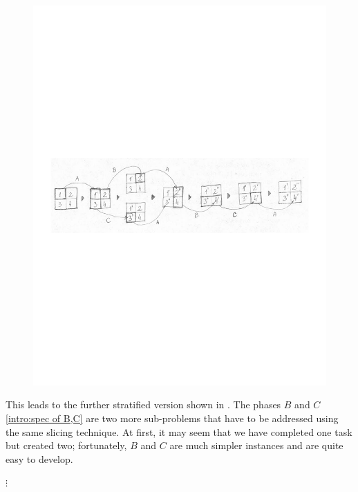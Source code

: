 \begin{figure}
\begin{center}
\includegraphics[width=.9\textwidth]{img/gap-stratify-A}
\end{center}
\caption{\label{intro:arbiter stratify A chain}}
\end{figure}

This leads to the further stratified version shown in .
The phases
$B$ and $C$ \eqref{intro:spec of B,C} are two more sub-problems that have to be addressed using the same slicing technique.
At first, it may seem that we have completed one task but created two; 
fortunately, $B$ and $C$ are much simpler instances
and are quite easy to develop.



\begin{center}$\vdots$
\end{center}


